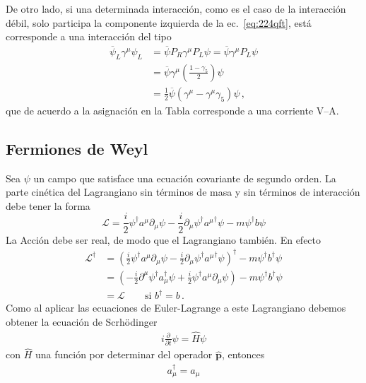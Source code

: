 De otro lado, si una determinada interacción, como es el caso de la interacción débil, solo participa la componente izquierda de la ec.~\eqref{eq:224qft}, está corresponde a una interacción del tipo
\begin{align}
  \overline{\psi}_L\gamma^\mu\psi_L&=\overline{\psi}P_R\gamma^\mu P_L\psi=\overline{\psi}\gamma^\mu P_L\psi\nonumber\\
  &=\overline{\psi}\gamma^\mu\left(\frac{1-\gamma_5}{2}\right)\psi\nonumber\\
  &=\tfrac{1}{2}\overline{\psi}\left(\gamma^\mu-\gamma^\mu\gamma_5\right)\psi\,,
\end{align}
que de acuerdo a la asignación en la Tabla corresponde a una corriente V--A. 

\subsection{Fermiones de Weyl}
\label{sec:fermiones-de-weyl}
Sea $\psi$ un campo que satisface una ecuaci\'on covariante de segundo orden. La parte cin\'etica del Lagrangiano sin t\'erminos de masa y sin t\'erminos de interacci\'on debe tener la forma 
\begin{equation}
\label{eq:98}
  \mathcal{L}=\frac{i}{2}\psi^\dagger a^\mu\partial_\mu\psi-\frac{i}{2}\partial_\mu\psi^\dagger {a^\mu}^\dagger\psi-m\psi^\dagger b\psi
\end{equation}
La Acci\'on debe ser real, de modo que el Lagrangiano tambi\'en. En efecto
\begin{align*}
  \mathcal{L}^\dagger&=\left(\frac{i}{2}\psi^\dagger a^\mu\partial_\mu\psi-\frac{i}{2}\partial_\mu\psi^\dagger {a^\mu}^\dagger\psi\right)^\dagger-m\psi^\dagger b^\dagger \psi\\
  &=\left(-\frac{i}{2}\partial^\mu\psi^\dagger a_\mu^\dagger \psi+\frac{i}{2}\psi^\dagger {a^\mu} \partial_\mu\psi\right)-m\psi^\dagger b^\dagger \psi\\
  &=\mathcal{L} \qquad \text{si }b^\dagger = b\,.
\end{align*}
Como al aplicar las ecuaciones de Euler-Lagrange a este Lagrangiano debemos obtener la ecuaci\'on de Scrh\"odinger
\begin{align}
i\frac{\partial}{\partial t}\psi=\widehat{H}\psi
\end{align}
con $\widehat{H}$ una funci\'on por determinar del operador $\hat{\mathbf{p}}$, entonces
\begin{align}
  a_\mu^\dagger=a_\mu
\end{align}

